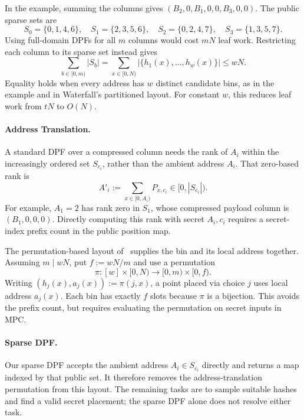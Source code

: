 In the example, summing the columns gives
$(B_2,0,B_1,0,0,B_3,0,0)$. The public sparse sets are
\[
 S_0=\{0,1,4,6\},\quad S_1=\{2,3,5,6\},\quad
 S_2=\{0,2,4,7\},\quad S_3=\{1,3,5,7\}.
\]
Using full-domain DPFs for all $m$ columns would cost $mN$ leaf work.
Restricting each column to its sparse set instead gives
\[
 \sum_{b\in[0,m)}|S_b|
 =\sum_{x\in[0,N)}\bigl|\{h_1(x),\ldots,h_w(x)\}\bigr|
 \leq wN.
\]
Equality holds when every address has $w$ distinct candidate bins, as in the
example and in Waterfall's partitioned layout. For constant $w$, this
reduces leaf work from $tN$ to $O(N)$.

\paragraph{Address Translation.}
A standard DPF over a compressed column needs the rank of $A_i$ within the
increasingly ordered set $S_{c_i}$, rather than the ambient address $A_i$.
That zero-based rank is
\[
 A'_i:=\sum_{x\in[0,A_i)}P_{x,c_i}\in[0,|S_{c_i}|).
\]
For example, $A_1=2$ has rank zero in $S_1$, whose compressed payload
column is $(B_1,0,0,0)$. Directly computing this rank with secret $A_i,c_i$
requires a secret-index prefix count in the public position map.

The permutation-based layout of~\cite{dmpf} supplies the bin and its local
address together. Assuming $m\mid wN$, put $f:=wN/m$ and use a permutation
\[
 \pi:[w]\times[0,N)\longrightarrow[0,m)\times[0,f).
\]
Writing $(h_j(x),a_j(x)):=\pi(j,x)$, a point placed via choice $j$ uses
local address $a_j(x)$. Each bin has exactly $f$ slots because $\pi$ is a
bijection. This avoids the prefix count, but requires evaluating the
permutation on secret inputs in MPC.

\paragraph{Sparse DPF.}
Our sparse DPF accepts the ambient address $A_i\in S_{c_i}$ directly and
returns a map indexed by that public set. It therefore removes the
address-translation permutation from this layout. The remaining tasks are
to sample suitable hashes and find a valid secret placement; the sparse DPF
alone does not resolve either task.

